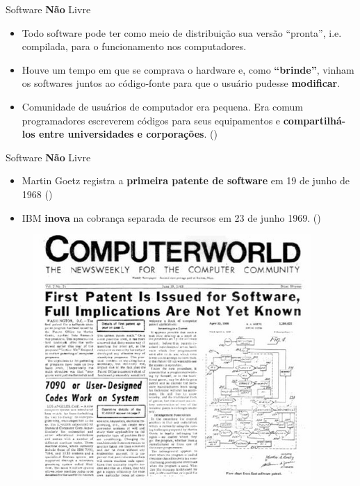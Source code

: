 \documentclass{beamer}
\begin{document}
\begin{frame}{Software \textbf{Não} Livre}
    \begin{itemize}
        \item Todo software pode ter como meio de distribuição sua versão ``pronta'', i.e. compilada, para o funcionamento nos computadores.
        \item Houve um tempo em que se comprava o hardware e, como \textbf{``brinde''}, vinham os softwares juntos ao código-fonte para que o usuário pudesse \textbf{modificar}.
        \item Comunidade de usuários de computador era pequena. Era comum programadores escreverem códigos para seus equipamentos e \textbf{compartilhá-los entre universidades e corporações}. (\cite{RTC2009})
    \end{itemize}
\end{frame}

\begin{frame}{Software \textbf{Não} Livre}
    \begin{itemize}
        \item Martin Goetz registra a \textbf{primeira patente de software} em 19 de junho de 1968 (\cite{torres2013}) 
        \item IBM \textbf{inova} na cobrança separada de recursos em 23 de junho 1969. (\cite{johnson1998})
    \end{itemize}
    \begin{figure}
        \centering
        \includegraphics[width=0.4\linewidth]{img/Computerworld.png}
    \end{figure}
\end{frame}
\end{document}
